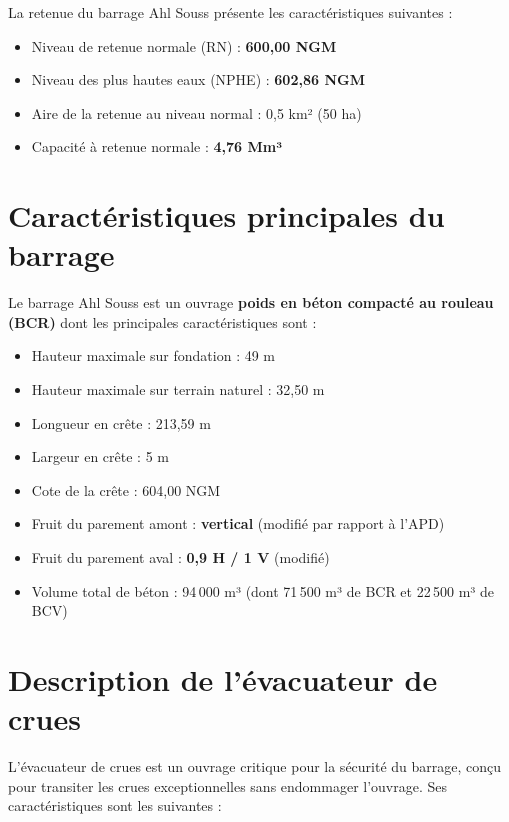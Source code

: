 La retenue du barrage Ahl Souss présente les caractéristiques suivantes \cite{fiche_synoptique, bilans_apports} :
\begin{itemize}
    \item Niveau de retenue normale (RN) : \textbf{600,00 NGM}
    \item Niveau des plus hautes eaux (NPHE) : \textbf{602,86 NGM}
    \item Aire de la retenue au niveau normal : 0,5 km² (50 ha)
    \item Capacité à retenue normale : \textbf{4,76 Mm³}
\end{itemize}

\section{Caractéristiques principales du barrage}
\label{sec:caracteristiques_barrage}

Le barrage Ahl Souss est un ouvrage \textbf{poids en béton compacté au rouleau (BCR)} dont les principales caractéristiques sont \cite{fiche_synoptique, fiche_historique} :
\begin{itemize}
    \item Hauteur maximale sur fondation : 49 m
    \item Hauteur maximale sur terrain naturel : 32,50 m
    \item Longueur en crête : 213,59 m
    \item Largeur en crête : 5 m
    \item Cote de la crête : 604,00 NGM
    \item Fruit du parement amont : \textbf{vertical} (modifié par rapport à l'APD)
    \item Fruit du parement aval : \textbf{0,9 H / 1 V} (modifié)
    \item Volume total de béton : 94\,000 m³ (dont 71\,500 m³ de BCR et 22\,500 m³ de BCV)
\end{itemize}

\section{Description de l'évacuateur de crues}
\label{sec:evacuateur_crues}

L'évacuateur de crues est un ouvrage critique pour la sécurité du barrage, conçu pour transiter les crues exceptionnelles sans endommager l'ouvrage. Ses caractéristiques sont les suivantes \cite{fiche_synoptique, note_calcul_evacuateur} :

